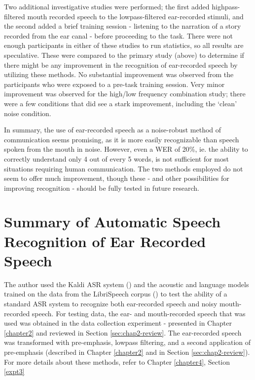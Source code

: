 Two additional investigative studies were performed; the first added highpass-filtered mouth recorded speech to the lowpass-filtered ear-recorded stimuli, and the second added a brief training session - listening to the narration of a story recorded from the ear canal - before proceeding to the task.  There were not enough participants in either of these studies to run statistics, so all results are speculative.  These were compared to the primary study (above) to determine if there might be any improvement in the recognition of ear-recorded speech by utilizing these methods.  No substantial improvement was observed from the participants who were exposed to a pre-task training session.  Very minor improvement was observed for the high/low frequency combination study; there were a few conditions that did see a stark improvement, including the `clean' noise condition.

In summary, the use of ear-recorded speech as a noise-robust method of communication seems promising, as it is more easily recognizable than speech spoken from the mouth in noise.  However, even a WER of 20\%, ie. the ability to correctly understand only 4 out of every 5 words, is not sufficient for most situations requiring human communication.  The two methods employed do not seem to offer much improvement, though these - and other possibilities for improving recognition - should be fully tested in future research.



\section{Summary of Automatic Speech Recognition of Ear Recorded Speech}\label{sec:chap4-review}

The author used the Kaldi ASR system (\cite{povey:11}) and the acoustic and language models trained on the data from the LibriSpeech corpus (\cite{panayotov:15}) to test the ability of a standard ASR system to recognize both ear-recorded speech and noisy mouth-recorded speech.  For testing data, the ear- and mouth-recorded speech that was used was obtained in the data collection experiment - presented in Chapter \ref{chapter2} and reviewed in Section \ref{sec:chap2-review}.  The ear-recorded speech was transformed with pre-emphasis, lowpass filtering, and a second application of pre-emphasis (described in Chapter \ref{chapter2} and in Section \ref{sec:chap2-review}). For more details about these methods, refer to Chapter \ref{chapter4}, Section \ref{expt3}

